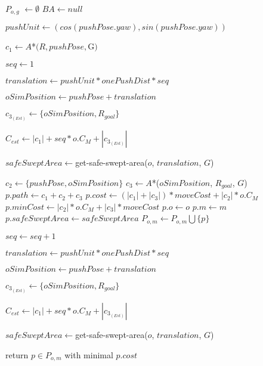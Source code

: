 \begin{algorithm}[H]
  \begin{algorithmic}[1]


      \State $P_{o,g}$ $\gets \emptyset$
      \State $BA \gets null$

        \State $pushUnit \gets (cos(pushPose.yaw), sin(pushPose.yaw))$

        \State $c_{1} \gets A$*$(R, pushPose, $G$)$

        \State $seq \gets 1$

        \State $translation \gets pushUnit * onePushDist * seq$

        \State $oSimPosition \gets pushPose + translation$

        \State $c_{3_{(Est)}} \gets \{oSimPosition, R_{goal}\}$

        \State $C_{est} \gets |c_{1}| + seq * o.C_{M} + |c_{3_{(Est)}}|$

        \State $safeSweptArea \gets $get-safe-swept-area($o$, $translation$, $G$)


            \State $c_{2} \gets \{pushPose, oSimPosition\}$
            \State $c_{3} \gets A$*($oSimPosition$, $R_{goal}$, $G$)
            \State $p.path \gets c_{1} + c_{2} + c_{3}$
            \State $p.cost \gets (|c_{1}| + |c_{3}|) * moveCost + |c_{2}| * o.C_{M}$
            \State $p.minCost \gets |c_{2}| * o.C_{M} + |c_{3}| * moveCost$
            \State $p.o \gets o$
            \State $p.m \gets m$
            \State $p.safeSweptArea \gets safeSweptArea$
            \State $P_{o,m} \gets P_{o,m} \bigcup \{p\}$
          \EndIf

          \State $seq \gets seq + 1$

          \State $translation \gets pushUnit * onePushDist * seq$

          \State $oSimPosition \gets pushPose + translation$

          \State $c_{3_{(Est)}} \gets \{oSimPosition, R_{goal}\}$

          \State $C_{est} \gets |c_{1}| + seq * o.C_{M} + |c_{3_{(Est)}}|$

          \State $safeSweptArea \gets $get-safe-swept-area($o$, $translation$, $G$)

        \EndWhile

      \EndFor

    \State return $p \in P_{o,m}$ with minimal $p.cost$

    \EndProcedure

  \end{algorithmic}
\end{algorithm}
